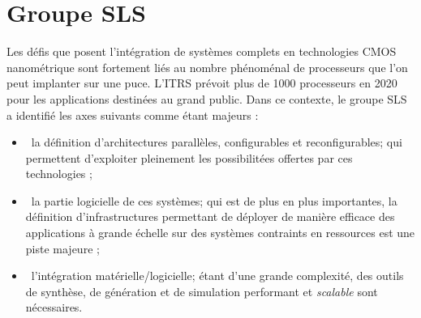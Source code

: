 \section{Groupe SLS}
Les défis que posent l'intégration de systèmes complets en technologies CMOS nanométrique sont fortement liés au nombre phénoménal de processeurs que l'on peut implanter sur une puce. L'ITRS prévoit plus de 1000 processeurs en 2020 pour les applications destinées au grand public. Dans ce contexte, le groupe SLS a identifié les axes suivants comme étant majeurs :
\begin{itemize}
\item\ la définition d'architectures parallèles, configurables et reconfigurables; qui permettent d'exploiter pleinement les possibilitées offertes par ces technologies ;
\item\ la partie logicielle de ces systèmes; qui est de plus en plus importantes, la définition d'infrastructures permettant de déployer de manière efficace des applications à grande échelle sur des systèmes contraints en ressources est une piste majeure ;
\item\ l'intégration matérielle/logicielle; étant d'une grande complexité, des outils de synthèse, de génération et de simulation performant et \textit{scalable} sont nécessaires.
\end{itemize}